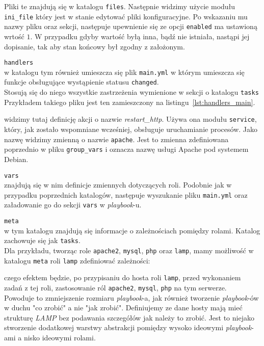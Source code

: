 \begin{description}
		Pliki te znajdują się w katalogu \texttt{files}.
		Następnie widzimy użycie modułu \texttt{ini\_file} który jest w stanie edytować pliki konfiguracyjne.
		Po wskazaniu mu nazwy pliku oraz sekcji, następuje upewnienie się ze opcji \texttt{enabled} ma ustawioną wrtość $1$.
		W przypadku gdyby wartość byłą inna, bądź nie istniała, nastąpi jej dopisanie, tak aby stan końcowy był zgodny z założonym.
	\item{\texttt{handlers}}\\
		w katalogu tym również umieszcza się plik \texttt{main.yml} w którym umieszcza się funkcje obsługujące wystąpienie statusu \texttt{changed}.\\
		Stosują się do niego wszystkie zastrzeżenia wymienione w sekcji o katalogu \texttt{tasks}
		Przykładem takiego pliku jest ten zamieszczony na listingu~\ref{lst:handlers_main}.
		
		widzimy tutaj definicję akcji o nazwie \textit{restart\_http}.
		Używa ona modułu \texttt{service}, który, jak zostało wspomniane wcześniej, obsługuje uruchamianie procesów.
		Jako nazwę widzimy zmienną o nazwie \texttt{apache}.
		Jest to zmienna zdefiniowana poprzednio w pliku \texttt{group\_vars} i oznacza nazwę usługi Apache pod systemem Debian.
	\item{\texttt{vars}}\\
		znajdują się w nim definicje zmiennych dotyczących roli.
		Podobnie jak w przypadku poprzednich katalogów, następuje wyszukanie pliku \texttt{main.yml} oraz załadowanie go do sekcji \texttt{vars} w \textit{playbook}-u.
	\item{\texttt{meta}}\\
		w tym katalogu znajdują się informacje o zależnościach pomiędzy rolami.
		Katalog zachowuje się jak \texttt{tasks}.\\
		Dla przykładu, tworząc role \texttt{apache2}, \texttt{mysql}, \texttt{php} oraz \texttt{lamp}, mamy możliwość w katalogu \texttt{meta} roli \texttt{lamp} zdefiniować zależności:
		
		czego efektem będzie, po przypisaniu do hosta roli \texttt{lamp}, przed wykonaniem zadań z tej roli, zastosowanie ról \texttt{apache2}, \texttt{mysql}, \texttt{php} na tym serwerze.\\
		Powoduje to zmniejszenie rozmiaru \textit{playbook}-a, jak również tworzenie \textit{playbook}-ów w duchu "co zrobić" a nie "jak zrobić".
		Definiujemy ze dane hosty mają mieć strukturę \textit{LAMP} bez podawania szczegółów jak należy to zrobić.
		Jest to niejako stworzenie dodatkowej warstwy abstrakcji pomiędzy wysoko ideowymi \textit{playbook}-ami a nisko ideowymi rolami.\\
\end{description}
